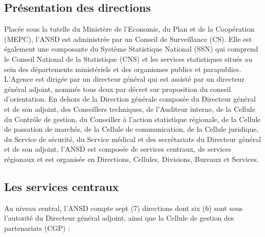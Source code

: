 \documentclass[12pt,a4paper,oneside]{report}
\begin{document}
\subsection{Présentation des directions}

Placée sous la tutelle du Ministère de l’Economie, du Plan et de la Coopération (MEPC), l’ANSD est administrée
par un Conseil de Surveillance (CS). Elle est également une composante du Système Statistique National (SSN)
qui comprend le Conseil National de la Statistique (CNS) et les services statistiques situés au sein des
départements ministériels et des organismes publics et parapublics. L’Agence est dirigée par un directeur
général qui est assisté par un directeur général adjoint, nommés tous deux par décret sur proposition du
conseil d’orientation. En dehors de la Direction générale composée du Directeur général et de son adjoint, des
Conseillers techniques, de l’Auditeur interne, de la Cellule du Contrôle de gestion, du Conseiller à l’action
statistique régionale, de la Cellule de passation de marchés, de la Cellule de communication, de la Cellule
juridique, du Service de sécurité, du Service médical et des secrétariats du Directeur général et de son
adjoint, l’ANSD est composée de services centraux, de services régionaux et est organisée en Directions,
Cellules, Divisions, Bureaux et Services.

\subsection{Les services centraux}

Au niveau central, l’ANSD compte sept (7) directions dont six (6) sont sous l’autorité du Directeur général
adjoint, ainsi que la Cellule de gestion des partenariats (CGP) :
\end{document}
